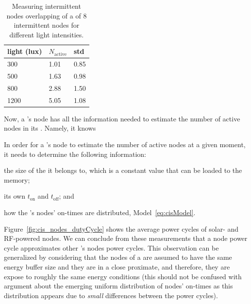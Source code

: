 \begin{table}
		\centering
		\caption{Measuring intermittent nodes overlapping of a \sys of 8 intermittent nodes for different light intensities.}
		\begin{tabular}{lll}
				\hline
				light (lux) & $N_\text{active}$ & std    \\
				\hline
				300	                  & 1.01 & 0.85   \\
				500                   & 1.63 & 0.98   \\
				800                   & 2.88 & 1.50   \\
				1200                  & 5.05 & 1.08   \\
				\hline
		\end{tabular}
		\label{tab:clusters}
\end{table}

Now, a \sys's node has all the information needed to estimate the number of active nodes in its \sys. Namely, it knows

In order for a \sys's node to estimate the number of active nodes at a given moment, it needs to determine the following information: 
\begin{enumerate*}[label=(\roman*)]
 \item the size of the \sys it belongs to, which is a constant value that can be loaded to the memory; 
 \item its own $t_\text{on}$ and $t_\text{off}$; and 
 \item how the \sys's nodes' on-times are distributed, Model~\ref{eq:cisModel}.
\end{enumerate*}
Figure~\ref{fig:cis_nodes_dutyCycle} shows the average power cycles of solar- and RF-powered nodes.
We can conclude from these measurements that a node power cycle approximates other \sys's nodes power cycles.
This observation can be generalized by considering that the nodes of a \sys are assumed to have the same energy buffer size and they are in a close proximate, and therefore, they are expose to roughly the same energy conditions (this should not be confused with argument about the emerging uniform distribution of nodes' on-times as this distribution appears due to \emph{small} differences between the power cycles).  

